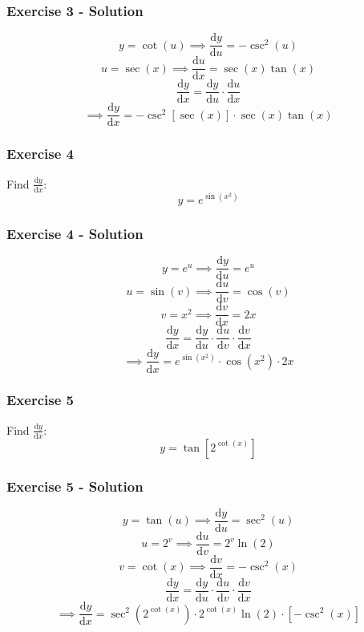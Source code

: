 \documentclass[12pt]{beamer}
\begin{document}
\begin{frame}
	\frametitle{Exercise 3 - Solution}

	\[y=\cot(u)\implies \frac{\mathrm{d}y}{\mathrm{d}u}=-\csc^2(u)\]
	\[u=\sec(x)\implies \frac{\mathrm{d}u}{\mathrm{d}x}=\sec(x)\tan(x)\]
	\vfill
	\large
	\[\frac{\mathrm{d}y}{\mathrm{d}x}=\frac{\mathrm{d}y}{\mathrm{d}u}\cdot \frac{\mathrm{d}u}{\mathrm{d}x}\]
	\vfill
	\[\implies \boxed{\frac{\mathrm{d}y}{\mathrm{d}x}=-\csc^2[\sec(x)]\cdot \sec(x)\tan(x)}\]
\end{frame}
\begin{frame}
	\frametitle{Exercise 4}

	\vfill
	\LARGE
	Find $\frac{\mathrm{d}y}{\mathrm{d}x}$:
	\vfill
	\[y=e^{\sin(x^2)}\]
	\vfill
	\vfill
	\vfill
\end{frame}
\begin{frame}
	\frametitle{Exercise 4 - Solution}

	\[y=e^u\implies \frac{\mathrm{d}y}{\mathrm{d}u}=e^u\]
	\[u=\sin(v)\implies \frac{\mathrm{d}u}{\mathrm{d}v}=\cos(v)\]
	\[v=x^2\implies \frac{\mathrm{d}v}{\mathrm{d}x}=2x\]
	\vfill
	\large
	\[\frac{\mathrm{d}y}{\mathrm{d}x}=\frac{\mathrm{d}y}{\mathrm{d}u}\cdot \frac{\mathrm{d}u}{\mathrm{d}v}\cdot \frac{\mathrm{d}v}{\mathrm{d}x}\]
	\vfill
	\[\implies \boxed{\frac{\mathrm{d}y}{\mathrm{d}x}=e^{\sin(x^2)}\cdot \cos(x^2)\cdot 2x}\]
\end{frame}
\begin{frame}
	\frametitle{Exercise 5}

	\vfill
	\LARGE
	Find $\frac{\mathrm{d}y}{\mathrm{d}x}$:
	\vfill
	\[y=\tan\left[2^{\cot(x)}\right]\]
	\vfill
	\vfill
	\vfill
\end{frame}
\begin{frame}
	\frametitle{Exercise 5 - Solution}

	\[y=\tan(u)\implies \frac{\mathrm{d}y}{\mathrm{d}u}=\sec^2(u)\]
	\[u=2^v\implies \frac{\mathrm{d}u}{\mathrm{d}v}=2^v\ln(2)\]
	\[v=\cot(x)\implies \frac{\mathrm{d}v}{\mathrm{d}x}=-\csc^2(x)\]
	\vfill
	\large
	\[\frac{\mathrm{d}y}{\mathrm{d}x}=\frac{\mathrm{d}y}{\mathrm{d}u}\cdot \frac{\mathrm{d}u}{\mathrm{d}v}\cdot \frac{\mathrm{d}v}{\mathrm{d}x}\]
	\vfill
	\[\implies \boxed{\frac{\mathrm{d}y}{\mathrm{d}x}=\sec^2(2^{\cot(x)})\cdot 2^{\cot(x)}\ln(2)\cdot [-\csc^2(x)]}\]
\end{frame}
\end{document}
